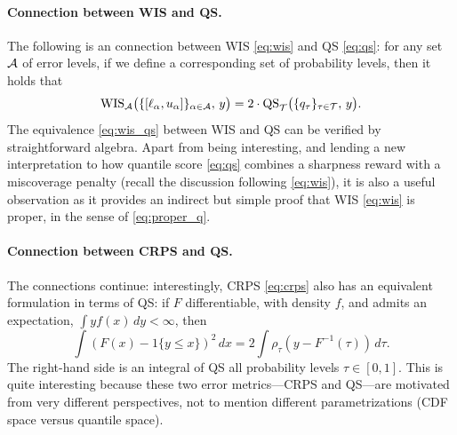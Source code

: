 \documentclass{article}
\begin{document}
\paragraph{Connection between WIS and QS.}

The following is an connection between WIS \eqref{eq:wis} and QS \eqref{eq:qs}: 
for any set $\mathcal{A}$ of error levels, if we define a corresponding set
 of
probability levels, then it holds that     
\begin{equation}
\label{eq:wis_qs}
\mathrm{WIS}_{\mathcal{A}} \big( \{[\ell_\alpha, u_\alpha]\}_{\alpha \in \mathcal{A}}, \, y \big)  
= 2 \cdot \mathrm{QS}_{\mathcal{T}} \big( \{q_\tau\}_{\tau \in \mathcal{T}}, \, y \big).
\end{equation}
The equivalence \eqref{eq:wis_qs} between WIS and QS can be verified by
straightforward algebra. Apart from being interesting, and lending a new 
interpretation to how quantile score \eqref{eq:qs} combines a sharpness reward
with a miscoverage penalty (recall the discussion following \eqref{eq:wis}), it
is also a useful observation as it provides an indirect but simple proof that
WIS \eqref{eq:wis} is proper, in the sense of \eqref{eq:proper_q}.

\paragraph{Connection between CRPS and QS.}

The connections continue: interestingly, CRPS \eqref{eq:crps} also has an
equivalent formulation in terms of QS: if $F$ differentiable, with density $f$,
and admits an expectation, $\int y f(x) \, dy < \infty$, then    
\begin{equation}
\label{eq:crps_qs}
\int (F(x) - 1\{y \leq x\})^2 \, dx = 
2 \int \rho_\tau(y - F^{-1}(\tau)) \, d\tau. 
\end{equation}
The right-hand side is an integral of QS all probability levels $\tau \in [0,1]$.
This is quite interesting because these two error metrics---CRPS and QS---are 
motivated from very different perspectives, not to mention different
parametrizations (CDF space versus quantile space).   
\end{document}
